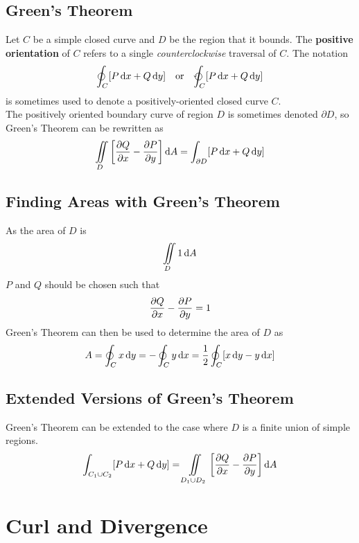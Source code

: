 \documentclass[./Calculus \Roman{3}.tex]{subfiles}
\begin{document}
		\subsection*{Green's Theorem}
			Let $C$ be a simple closed curve and $D$ be the region that it bounds. The \textbf{positive orientation} of $C$ refers to a single \textit{counterclockwise} traversal of $C$.
			The notation
				\begin{align*}
					\oint_C[P\,\d x + Q\,\d y] &&\text{or}&& \varointctrclockwise_C[P\,\d x + Q\,\d y]
				\end{align*}
				is sometimes used to denote a positively-oriented closed curve $C$. \\
			The positively oriented boundary curve of region $D$ is sometimes denoted $\partial D$, so Green's Theorem can be rewritten as
				\[\iint\limits_D \left[\frac{\partial Q}{\partial x} - \frac{\partial P}{\partial y}\right]\mathrm{d} A = \int_{\partial D}[P\,\mathrm{d} x + Q\,\mathrm{d} y]\]
		\subsection*{Finding Areas with Green's Theorem}
			As the area of $D$ is 
				\[\iint\limits_D 1\,\mathrm{d} A\]
				$P$ and $Q$ should be chosen such that
				\[\frac{\partial Q}{\partial x} - \frac{\partial P}{\partial y} = 1\]
				Green's Theorem can then be used to determine the area of $D$ as
				\[A = \oint_C x\,\mathrm{d} y = -\oint_C y\,\mathrm{d} x = \frac{1}{2}\oint_C[x\,\mathrm{d} y - y\,\mathrm{d} x]\]
		\subsection*{Extended Versions of Green's Theorem}
			Green's Theorem can be extended to the case where $D$ is a finite union of simple regions.
			\[\int_{C_1 \cup C_2}[P\,\mathrm{d} x + Q\,\mathrm{d} y] = \iint\limits_{D_1 \cup D_2}\left[\frac{\partial Q}{\partial x} - \frac{\partial P}{\partial y}\right]\mathrm{d} A\]
	\section{Curl and Divergence}
\end{document}
